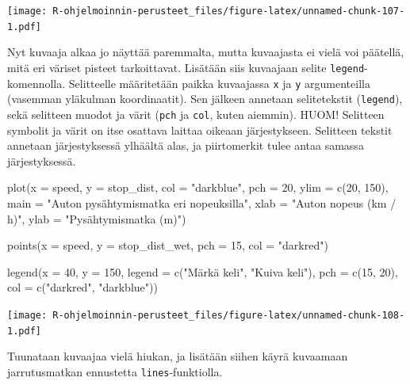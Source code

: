 \documentclass[
]{book}
\newenvironment{Shaded}{\begin{snugshade}}{\end{snugshade}}
\newcommand{\AttributeTok}[1]{\textcolor[rgb]{0.77,0.63,0.00}{#1}}
\newcommand{\DecValTok}[1]{\textcolor[rgb]{0.00,0.00,0.81}{#1}}
\newcommand{\FunctionTok}[1]{\textcolor[rgb]{0.00,0.00,0.00}{#1}}
\newcommand{\NormalTok}[1]{#1}
\newcommand{\StringTok}[1]{\textcolor[rgb]{0.31,0.60,0.02}{#1}}
\begin{document}
\texttt{[image: R-ohjelmoinnin-perusteet\_files/figure-latex/unnamed-chunk-107-1.pdf]}

Nyt kuvaaja alkaa jo näyttää paremmalta, mutta kuvaajasta ei vielä voi päätellä, mitä eri väriset pisteet tarkoittavat. Lisätään siis kuvaajaan selite \texttt{legend}-komennolla. Selitteelle määritetään paikka kuvaajassa \texttt{x} ja \texttt{y} argumenteilla (vasemman yläkulman koordinaatit). Sen jälkeen annetaan selitetekstit (\texttt{legend}), sekä selitteen muodot ja värit (\texttt{pch} ja \texttt{col}, kuten aiemmin). HUOM! Selitteen symbolit ja värit on itse osattava laittaa oikeaan järjestykseen. Selitteen tekstit annetaan järjestyksessä ylhäältä alas, ja piirtomerkit tulee antaa samassa järjestyksessä.

\begin{Shaded}
\begin{Highlighting}[]
\FunctionTok{plot}\NormalTok{(}\AttributeTok{x =}\NormalTok{ speed, }\AttributeTok{y =}\NormalTok{ stop\_dist,}
     \AttributeTok{col =} \StringTok{"darkblue"}\NormalTok{, }\AttributeTok{pch =} \DecValTok{20}\NormalTok{,}
     \AttributeTok{ylim =} \FunctionTok{c}\NormalTok{(}\DecValTok{20}\NormalTok{, }\DecValTok{150}\NormalTok{),}
     \AttributeTok{main =} \StringTok{"Auton pysähtymismatka eri nopeuksilla"}\NormalTok{,}
     \AttributeTok{xlab =} \StringTok{"Auton nopeus (km / h)"}\NormalTok{, }\AttributeTok{ylab =} \StringTok{"Pysähtymismatka (m)"}\NormalTok{)}

\FunctionTok{points}\NormalTok{(}\AttributeTok{x =}\NormalTok{ speed, }\AttributeTok{y =}\NormalTok{ stop\_dist\_wet, }\AttributeTok{pch =} \DecValTok{15}\NormalTok{, }\AttributeTok{col =} \StringTok{"darkred"}\NormalTok{)}

\FunctionTok{legend}\NormalTok{(}\AttributeTok{x =} \DecValTok{40}\NormalTok{, }\AttributeTok{y =} \DecValTok{150}\NormalTok{,}
       \AttributeTok{legend =} \FunctionTok{c}\NormalTok{(}\StringTok{"Märkä keli"}\NormalTok{, }\StringTok{"Kuiva keli"}\NormalTok{),}
       \AttributeTok{pch =} \FunctionTok{c}\NormalTok{(}\DecValTok{15}\NormalTok{, }\DecValTok{20}\NormalTok{), }\AttributeTok{col =} \FunctionTok{c}\NormalTok{(}\StringTok{"darkred"}\NormalTok{, }\StringTok{"darkblue"}\NormalTok{))}
\end{Highlighting}
\end{Shaded}

\texttt{[image: R-ohjelmoinnin-perusteet\_files/figure-latex/unnamed-chunk-108-1.pdf]}

Tuunataan kuvaajaa vielä hiukan, ja lisätään siihen käyrä kuvaamaan jarrutusmatkan ennustetta \texttt{lines}-funktiolla.
\end{document}
